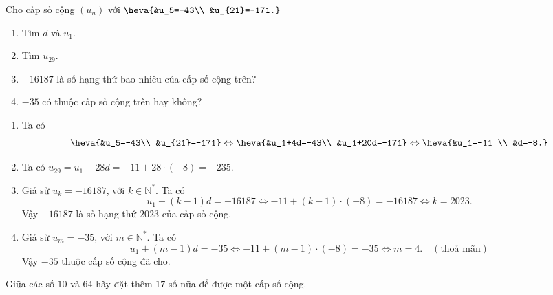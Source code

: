 \begin{vd}[TH]%
	Cho cấp số cộng $(u_n)$ với $\heva{&u_5=-43\\ &u_{21}=-171.}$
	\begin{enumerate}
		\item Tìm $d$ và $u_1$.
		\item Tìm $u_{29}$.
		\item $-16187$ là số hạng thứ bao nhiêu của cấp số cộng trên?
		\item $-35$ có thuộc cấp số cộng trên hay không?		
	\end{enumerate}
	\loigiai
	{
		\begin{enumerate}
			\item Ta có
			\begin{eqnarray*}
				\heva{&u_5=-43\\ &u_{21}=-171} \Leftrightarrow \heva{&u_1+4d=-43\\ &u_1+20d=-171} \Leftrightarrow \heva{&u_1=-11 \\ &d=-8.}
			\end{eqnarray*}
			\item Ta có $u_{29}= u_1+28d= -11+28 \cdot (-8)= -235$.
			\item Giả sử $u_k= -16187$, với $k \in \mathbb{N}^*$. Ta có
			\[
			u_1+ (k-1)d= -16187 \Leftrightarrow -11 + (k-1) \cdot (-8)= -16187 \Leftrightarrow k= 2023.
			\]
			Vậy $-16187$ là số hạng thứ $2023$ của cấp số cộng.
			\item Giả sử $u_m= -35$, với $m\in \mathbb{N}^*$. Ta có
			\[
			u_1+ (m-1) d= -35 \Leftrightarrow -11+ (m-1) \cdot (-8)= -35 \Leftrightarrow m=4. \quad (\text{thoả mãn})
			\]
			Vậy $-35$ thuộc cấp số cộng đã cho.
		\end{enumerate}
	}
\end{vd}

\begin{bt}[TH]%
	Giữa các số $10$ và $64$ hãy đặt thêm $17$ số nữa để được một cấp số cộng.
\end{bt}

